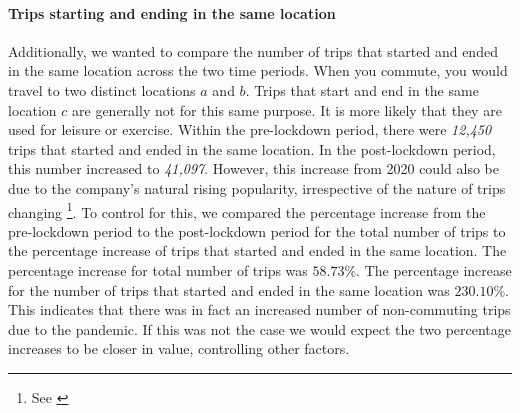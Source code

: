 \documentclass[11pt,a4paper]{article}
\begin{document}
\paragraph{Trips starting and ending in the same location} Additionally, we wanted to compare the number of trips that started and ended in the same location across the two time periods. When you commute, you would travel to two distinct locations $a$ and $b$. Trips that start and end in the same location $c$ are generally not for this same purpose. It is more likely that they are used for leisure or exercise. Within the pre-lockdown period, there were \emph{12,450} trips that started and ended in the same location. In the post-lockdown period, this number increased to \emph{41,097}. However, this increase from 2020 could also be due to the company's natural rising popularity, irrespective of the nature of trips changing \footnote{See \emph{}}. To control for this, we compared the percentage increase from the pre-lockdown period to the post-lockdown period for the total number of trips to the percentage increase of trips that started and ended in the same location. The percentage increase for total number of trips was $58.73\%$. The percentage increase for the number of trips that started and ended in the same location was $230.10\%$. This indicates that there was in fact an increased number of non-commuting trips due to the pandemic. If this was not the case we would expect the two percentage increases to be closer in value, controlling other factors. 
\end{document}
